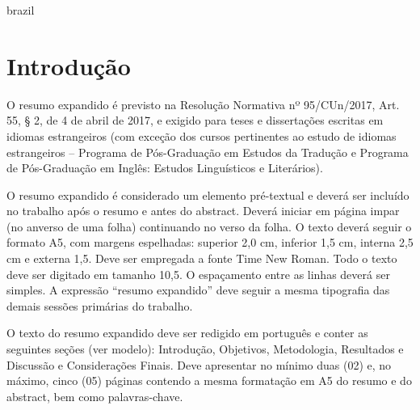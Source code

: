 

\makeatletter
\ifenglish

    \cleardoublepage{}

    \begin{otherlanguage*}{brazil}
        \setlength{\parskip}{0.2cm}
        \setlength{\parindent}{0.0cm}
        \selectfont

        \section*{Introdução}
        O resumo expandido é previsto na Resolução Normativa nº 95/CUn/2017, Art. 55, § 2, de 4 de
        abril de 2017, e exigido para teses e dissertações escritas em idiomas estrangeiros (com
        exceção dos cursos pertinentes ao estudo de idiomas estrangeiros – Programa de Pós-Graduação
        em Estudos da Tradução e Programa de Pós-Graduação em Inglês: Estudos Linguísticos e
        Literários).

        O resumo expandido é considerado um elemento pré-textual e deverá ser incluído no trabalho
        após o resumo e antes do abstract. Deverá iniciar em página impar (no anverso de uma folha)
        continuando no verso da folha. O texto deverá seguir o formato A5, com margens espelhadas:
        superior 2,0 cm, inferior 1,5 cm, interna 2,5 cm e externa 1,5. Deve ser empregada a fonte
        Time New Roman.  Todo o texto deve ser digitado em tamanho 10,5. O espaçamento entre as
        linhas deverá ser simples. A expressão “resumo expandido” deve seguir a mesma tipografia das
        demais sessões primárias do trabalho.

        O texto do resumo expandido deve ser redigido em português e conter as seguintes seções (ver
        modelo): Introdução, Objetivos, Metodologia, Resultados e Discussão e Considerações Finais.
        Deve apresentar no mínimo duas (02) e, no máximo, cinco (05) páginas contendo a mesma
        formatação em A5 do resumo e do abstract, bem como palavras-chave. \englishword{\showfont}


\end{otherlanguage*}
